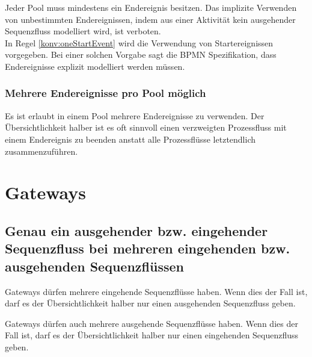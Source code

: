 \documentclass[12pt,report]{snetTeaching}
\begin{document}
Jeder Pool muss mindestens ein Endereignis besitzen. Das implizite Verwenden von unbestimmten Endereignissen, indem aus einer Aktivität kein ausgehender Sequenzfluss modelliert wird, ist verboten. \\
In Regel \ref{konv:oneStartEvent} wird die Verwendung von Startereignissen vorgegeben. Bei einer solchen Vorgabe sagt die BPMN Spezifikation, dass Endereignisse explizit modelliert werden müssen. 

\begin{Rahmen}
	\hfill
\end{Rahmen}

\subsubsection{Mehrere Endereignisse pro Pool möglich}

Es ist erlaubt in einem Pool mehrere Endereignisse zu verwenden. Der Übersichtlichkeit halber ist es oft sinnvoll einen verzweigten Prozessfluss mit einem Endereignis zu beenden anstatt alle Prozessflüsse letztendlich zusammenzuführen.

\begin{Rahmen}
	\hfill
\end{Rahmen}







\clearpage
\section{Gateways}

\subsection{Genau ein ausgehender bzw. eingehender Sequenzfluss bei mehreren eingehenden bzw. ausgehenden Sequenzflüssen}


Gateways dürfen mehrere eingehende Sequenzflüsse haben. Wenn dies der Fall ist, darf es der Übersichtlichkeit halber nur einen ausgehenden Sequenzfluss geben.

Gateways dürfen auch mehrere ausgehende Sequenzflüsse haben. Wenn dies der Fall ist, darf es der Übersichtlichkeit halber nur einen eingehenden Sequenzfluss geben.

\begin{Rahmen}
	\hfill
\end{Rahmen}
\end{document}
